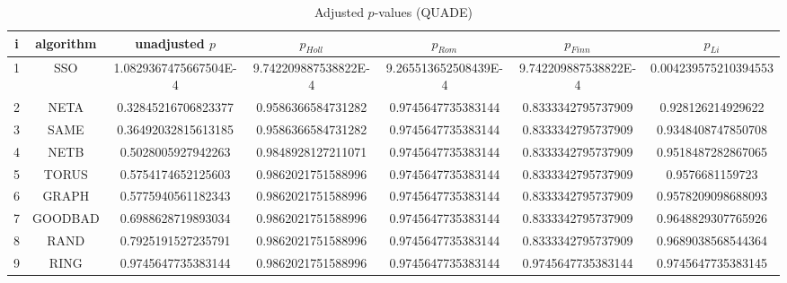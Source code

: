 \documentclass[a4paper,10pt]{article}
\begin{document}
\begin{landscape}
\begin{table}[!htp]
\centering\scriptsize
\caption{Adjusted $p$-values (QUADE)}
\begin{tabular}{ccccccc}
i&algorithm&unadjusted $p$&$p_{Holl}$&$p_{Rom}$&$p_{Finn}$&$p_{Li}$\\
\hline
1& SSO&1.0829367475667504E-4&9.742209887538822E-4&9.265513652508439E-4&9.742209887538822E-4&0.004239575210394553\\
2& NETA&0.32845216706823377&0.9586366584731282&0.9745647735383144&0.8333342795737909&0.928126214929622\\
3& SAME&0.36492032815613185&0.9586366584731282&0.9745647735383144&0.8333342795737909&0.9348408747850708\\
4& NETB&0.5028005927942263&0.9848928127211071&0.9745647735383144&0.8333342795737909&0.9518487282867065\\
5& TORUS&0.5754174652125603&0.9862021751588996&0.9745647735383144&0.8333342795737909&0.9576681159723\\
6& GRAPH&0.5775940561182343&0.9862021751588996&0.9745647735383144&0.8333342795737909&0.9578209098688093\\
7& GOODBAD&0.6988628719893034&0.9862021751588996&0.9745647735383144&0.8333342795737909&0.9648829307765926\\
8& RAND&0.7925191527235791&0.9862021751588996&0.9745647735383144&0.8333342795737909&0.9689038568544364\\
9& RING&0.9745647735383144&0.9862021751588996&0.9745647735383144&0.9745647735383144&0.9745647735383145\\
\hline
\end{tabular}
\end{table}

\end{landscape}
\end{document}
